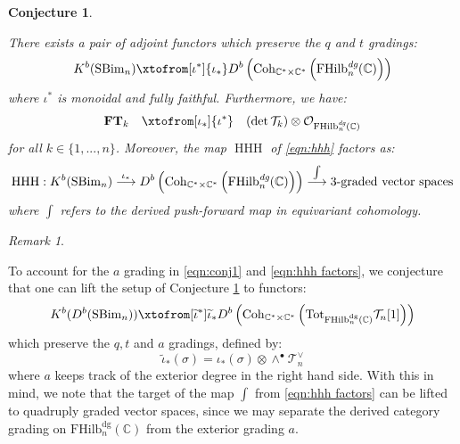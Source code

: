 \documentclass[12pt]{amsart}
\numberwithin{equation}{section}
\newtheorem{conjecture}[theorem]{Conjecture}
\theoremstyle{definition}
\theoremstyle{remark}
\newtheorem{remark}[theorem]{Remark}
\DeclareMathOperator{\HHH}{HHH}
\newcommand{\CC}{\mathbb{C}}
\newcommand{\CO}{\mathcal{O}}
\newcommand{\CT}{\mathcal{T}}
\newcommand{\FT}{\mathbf{FT}}
\renewcommand{\1}{\mathbf{1}}
\newcommand{\coh}{\mathrm{Coh}}
\newcommand{\FH}{\mathrm{FHilb}}
\newcommand{\SBim}{\mathrm{SBim}}
\newcommand{\torus}{\CC^{*} \times \CC^*}
\newcommand{\dg}{\text{dg}}%
\newcommand{\edg}{\emph{dg}}
\newcommand{\tot}{\mathrm{Tot}}
\begin{document}
\begin{conjecture}
\label{conj:1}

There exists a pair of adjoint functors which preserve the $q$ and $t$ gradings:
\begin{equation}
\label{eqn:conj1}
K^b(\SBim_n) \xtofrom[\iota^*]{\iota_*} D^b\left(\coh_{\torus} \left( \FH_n^\edg(\CC) \right) \right)
\end{equation}
where $\iota^*$ is monoidal and fully faithful. Furthermore, we have: 
\begin{equation}
\label{eqn:addendum}
\FT_k \quad \xtofrom[\iota_*]{\iota^*} \quad ( \det \CT_k ) \otimes \CO_{\FH^\edg_n(\CC)}
\end{equation}
for all $k\in \{1,...,n\}$. Moreover, the map $\HHH$ of \eqref{eqn:hhh} factors as:
\begin{equation}
\label{eqn:hhh factors}
\HHH: K^b(\SBim_n) \stackrel{\iota_*}\longrightarrow D^b\left(\coh_{\torus} \left( \FH_n^\edg(\CC) \right) \right) \stackrel{\int}\longrightarrow \text{3-graded vector spaces}
\end{equation}
where $\int$ refers to the derived push-forward map in equivariant cohomology. \\

\end{conjecture}

\begin{remark}
\label{rem:a grading}

To account for the $a$ grading in \eqref{eqn:conj1} and \eqref{eqn:hhh factors}, we conjecture that one can lift the setup of Conjecture \ref{conj:1} to functors:
\begin{equation}
\label{eqn:conj2}
K^b(D^b(\SBim_n)) \xtofrom[\widetilde{\iota}^*]{\widetilde{\iota}_*} D^b\left(\coh_{\torus} \left( \tot_{\FH_n^\dg(\CC)} \CT_n[1] \right) \right)
\end{equation}
which preserve the $q,t$ and $a$ gradings, defined by: 
\begin{equation}
\label{eqn:iota wedge}
\widetilde{\iota}_*(\sigma) = \iota_*(\sigma) \otimes \wedge^\bullet \CT_n^\vee
\end{equation}
where $a$ keeps track of the exterior degree in the right hand side. With this in mind, we note that the target of the map $\int$ from \eqref{eqn:hhh factors} can be lifted to quadruply graded vector spaces, since we may separate the derived category grading on $\FH_n^\dg(\CC)$ from the exterior grading $a$.

\end{remark}
\end{document}
